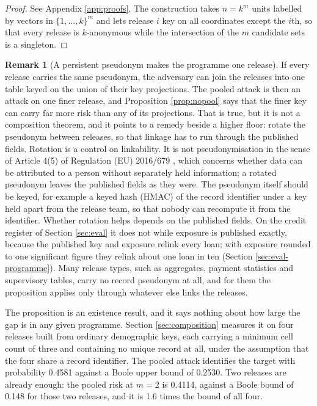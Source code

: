\documentclass[11pt,a4paper]{article}
\theoremstyle{plain}
\theoremstyle{definition}
\newtheorem{remark}{Remark}
\theoremstyle{definition}
\theoremstyle{plain}
\begin{document}
\begin{proof}
See Appendix \ref{app:proofs}. The construction takes $n = k^m$ units labelled
by vectors in $\{1, \dots, k\}^m$ and lets release $i$ key on all coordinates
except the $i$th, so that every release is $k$-anonymous while the intersection
of the $m$ candidate sets is a singleton.
\end{proof}

\begin{remark}[A persistent pseudonym makes the programme one release]\label{rem:finer}
If every release carries the same pseudonym, the adversary can join the releases
into one table keyed on the union of their key projections. The pooled attack is
then an attack on one finer release, and Proposition \ref{prop:nopool} says that
the finer key can carry far more risk than any of its projections. That is true,
but it is not a composition theorem, and it points to a remedy beside a higher
floor: rotate the pseudonym between releases, so that linkage has to run through
the published fields. Rotation is a control on linkability. It is not
pseudonymisation in the sense of Article 4(5) of Regulation (EU) 2016/679
\citep{gdpr2016}, which concerns whether data can be attributed to a person
without separately held information; a rotated pseudonym leaves the published
fields as they were. The pseudonym itself should be keyed, for example a keyed
hash (HMAC) of the record identifier under a key held apart from the release
team, so that nobody can recompute it from the identifier. Whether rotation helps
depends on the published fields. On the credit register of Section
\ref{sec:eval} it does not while exposure is published exactly, because the
published key and exposure relink every loan; with exposure rounded to one
significant figure they relink about one loan in ten (Section
\ref{sec:eval-programme}). Many release
types, such as aggregates, payment statistics and supervisory tables, carry no
record pseudonym at all, and for them the proposition applies only through
whatever else links the releases.
\end{remark}

The proposition is an existence result, and it says nothing about how large the
gap is in any given programme. Section \ref{sec:composition} measures it on four
releases built from ordinary demographic keys, each carrying a minimum cell count
of three and containing no unique record at all, under the assumption that the
four share a record identifier. The pooled attack identifies the target with
probability 0.4581 against a Boole upper bound of 0.2530. Two releases are already
enough: the pooled risk at $m = 2$ is 0.4114, against a Boole bound of 0.148 for
those two releases, and it is 1.6 times the bound of all four.
\end{document}
